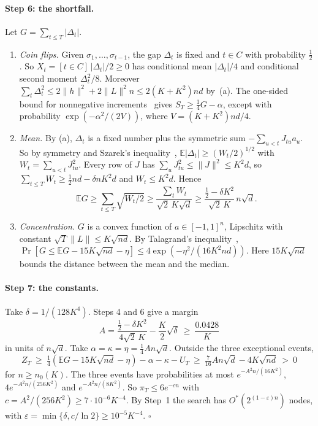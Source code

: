\documentclass[11pt,a4paper]{article}
\theoremstyle{definition}
\theoremstyle{remark}
\newcommand{\Ostar}{O^{*}}
\newcommand{\E}{\mathbb{E}}
\begin{document}
\paragraph{Step 6: the shortfall.} Let $G=\sum_{t\le T}|\Delta_t|$.
\begin{enumerate}
 \item[(a)] \emph{Coin flips.} Given $\sigma_1,\dots,\sigma_{t-1}$, the gap
 $\Delta_t$ is fixed and $t\in C$ with probability $\frac12$. So
 $X_t=[t\in C]\,|\Delta_t|/2\ge0$ has conditional mean $|\Delta_t|/4$ and
 conditional second moment $\Delta_t^2/8$. Moreover
 $\sum_t\Delta_t^2\le2\|h\|^2+2\|L\|^2n\le2(K+K^2)nd$ by~(a). The one-sided
 bound for nonnegative increments~\cite{Mau03,N8} gives
 $S_T\ge\frac14G-\alpha$, except with probability
 $\exp(-\alpha^2/(2V))$, where $V=(K+K^2)nd/4$.
 \item[(b)] \emph{Mean.} By (a), $\Delta_t$ is a fixed number plus the
 symmetric sum $-\sum_{u<t}J_{tu}a_u$. So by symmetry and Szarek's
 inequality~\cite{Sza76}, $\E|\Delta_t|\ge(W_t/2)^{1/2}$ with
 $W_t=\sum_{u<t}J_{tu}^2$. Every row of $J$ has
 $\sum_uJ_{tu}^2\le\|J\|^2\le K^2d$, so
 $\sum_{t\le T}W_t\ge\frac12nd-\delta n K^2d$ and $W_t\le K^2d$. Hence
 \[
 \E G\ge\sum_{t\le T}\sqrt{W_t/2}\ge\frac{\sum_tW_t}{\sqrt2\,K\sqrt d}
 \ge\frac{\frac12-\delta K^2}{\sqrt2\,K}\,n\sqrt d .
 \]
 \item[(c)] \emph{Concentration.} $G$ is a convex function of
 $a\in[-1,1]^n$, Lipschitz with constant $\sqrt T\|L\|\le K\sqrt{nd}$. By
 Talagrand's inequality~\cite{Tal95},
 $\Pr[G\le\E G-15K\sqrt{nd}-\eta]\le4\exp(-\eta^2/(16K^2nd))$. Here
 $15K\sqrt{nd}$ bounds the distance between the mean and the median.
\end{enumerate}

\paragraph{Step 7: the constants.} Take $\delta=1/(128K^4)$. Steps 4 and 6
give a margin
\[
 A=\frac{\frac12-\delta K^2}{4\sqrt2\,K}-\frac K2\sqrt\delta\ \ge\
 \frac{0.0428}K
\]
in units of $n\sqrt d$. Take $\alpha=\kappa=\eta=\frac14An\sqrt d$. Outside the
three exceptional events,
\[
 Z_T\ \ge\ \tfrac14(\E G-15K\sqrt{nd}-\eta)-\alpha-\kappa-U_T\
 \ge\ \tfrac7{16}An\sqrt d-4K\sqrt{nd}\ >\ 0
\]
for $n\ge n_0(K)$. The three events have probabilities at most
$e^{-A^2n/(16K^2)}$, $4e^{-A^2n/(256K^2)}$ and $e^{-A^2n/(8K^2)}$. So
$\pi_T\le6e^{-cn}$ with $c=A^2/(256K^2)\ge7\cdot10^{-6}K^{-4}$. By Step~1 the
search has $\Ostar(2^{(1-\varepsilon)n})$ nodes, with
$\varepsilon=\min\{\delta,c/\ln2\}\ge10^{-5}K^{-4}$. \hfill$\square$
\end{document}
